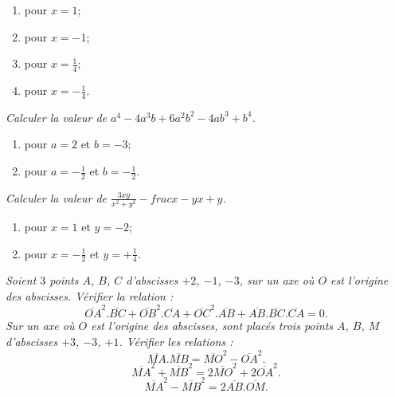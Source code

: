 \begin{itemize}
\begin{enumerate}
\item pour $x=1$;
\item pour $x=-1$;
\item pour $x=\frac14$;
\item pour $x=-\frac14$.
\end{enumerate}
\it Calculer la valeur de $a^4-4a^3b+6a^2b^2-4ab^3+b^4$. 
\begin{enumerate}
\item pour $a=2$ et $b=-3$;
\item pour $a=-\frac12$ et $b=-\frac12$.
\end{enumerate}
\it Calculer la valeur de $\displaystyle\frac{3xy}{x^2+y^2}-frac{x-y}{x+y}$.
\begin{enumerate}
\item pour $x=1$ et $y=-2$;
\item pour $x=-\frac12$ et $y=+\frac14$.
\end{enumerate}
\it Soient $3$ points $A$, $B$, $C$ d'abscisses $+2$, $-1$, $-3$, sur un axe où $O$ est l'origine des abscisses. Vérifier la relation : 
\[ \overline{OA}^2.\overline{BC}+\overline{OB}^2.\overline{CA}+\overline{OC}^2.\overline{AB} + \overline{AB}.\overline{BC}.\overline{CA} = 0.\]
\it Sur un axe où $O$ est l'origine des abscisses, sont placés trois points $A$, $B$, $M$ d'abscisses $+3$, $-3$, $+1$. Vérifier les relations : 
\[\overline{MA}.\overline{MB}=\overline{MO}^2-\overline{OA}^2.\]
\[ \overline{MA}^2+\overline{MB}^2=2\overline{MO}^2+2\overline{OA}^2.\]
\[\overline{MA}^2-\overline{MB}^2=2\overline{AB}.\overline{OM}.\]
\end{itemize}